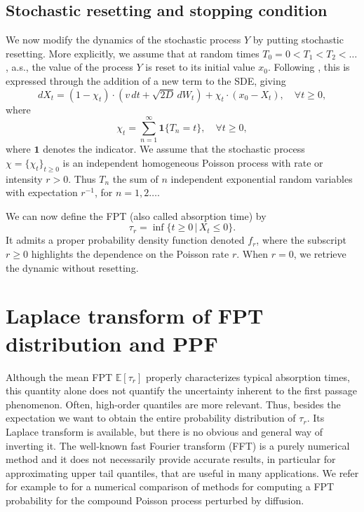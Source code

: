 \documentclass[preprint,12pt]{elsarticle}
\numberwithin{equation}{section}
\theoremstyle{plain} \newtheorem{theorem}{Theorem}[section]
\theoremstyle{plain} \newtheorem{proposition}[theorem]{Proposition}
\theoremstyle{plain} \newtheorem{lemma}[theorem]{Lemma}
\theoremstyle{plain} \newtheorem{corollary}[theorem]{Corollary}
\theoremstyle{definition} \newtheorem{definition}[theorem]{Definition}
\theoremstyle{definition} \newtheorem{notation}[theorem]{Notation}
\theoremstyle{remark} \newtheorem{remark}[theorem]{Remark}
\theoremstyle{remark} \newtheorem{remarks}[theorem]{Remarks}
\theoremstyle{remark} \newtheorem{algorithm2}[theorem]{Algorithm}
\theoremstyle{remark} \newtheorem{example}[theorem]{Example}
\newcommand{\E}{\mathbb{E}}
\begin{document}
\subsection{Stochastic resetting and stopping condition} \label{subsec:2-2}

We now modify the dynamics of the stochastic process $Y$ by putting
stochastic resetting.
More explicitly, we assume that at random times 
$T_0 = 0 < T_1 < T_2 < \ldots$, a.s., the value of the process $Y$
is reset to its initial value $x_0$.
Following \cite{evans_stochastic_2020},
this is expressed through the addition of a new term to the SDE,
giving 
\begin{equation} \label{eq:sde_with_resets}
	dX_t=(1-\chi_t) \cdot (v\,dt+\sqrt{2D}\,dW_t) +\chi_t \cdot (x_0-X_t),\quad \forall t\geq 0,
\end{equation}
where
\begin{equation*}
	\chi_t =\sum_{n=1}^\infty \mathbf{1} \{T_n = t\}, \quad \forall t \ge 0,
\end{equation*}
where 
$\mathbf{1}$ denotes the indicator.
We assume that the stochastic process $\chi=\{\chi_t\}_{t\ge 0}$ is an independent homogeneous Poisson process with rate or intensity $r>0$. Thus
$T_n$ the sum of $n$ independent exponential random variables with expectation $r^{-1}$, for
$n=1,2\ldots$.

We can now define the 
FPT (also called absorption time) by 
\begin{equation}\label{eq:fpt_rv}
	\tau_r=\inf\{t\geq 0\, | \, X_t\leq0\}.
\end{equation}
It admits a proper probability density function denoted $f_r$,
where the subscript $r \ge 0$ highlights the 
dependence on the Poisson rate $r$.
When $r=0$, we retrieve the dynamic without resetting.
 
\section{Laplace transform of FPT distribution and PPF} \label{sec:approxinv}
Although the mean FPT $\E[\tau_r]$ properly characterizes typical absorption times, this quantity alone does not quantify the uncertainty inherent to the first passage phenomenon. Often, high-order quantiles are more relevant.
Thus, 
besides the expectation
we want to obtain the entire probability 
distribution of $\tau_r$.
Its Laplace transform
is available, but there is no obvious and 
general way of inverting it.
The well-known fast Fourier transform (FFT) is a purely numerical
method and it does not necessarily provide accurate results, in particular for approximating
upper tail quantiles, that are useful in many applications.
We refer for example to 
\cite{gatto2012four} for
a numerical comparison of methods 
for computing a FPT probability 
for the compound Poisson process perturbed by diffusion.
\end{document}
